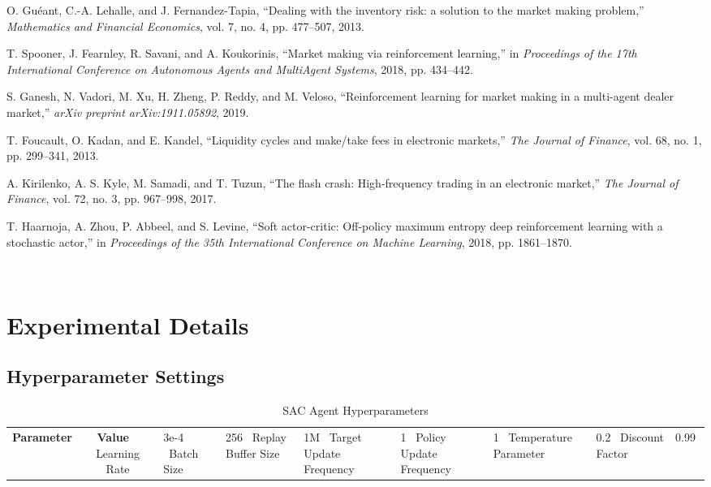 \documentclass[11pt,a4paper]{article}
\begin{document}
\begin{thebibliography}{99}
O. Gu{\'{e}}ant, C.-A. Lehalle, and J. Fernandez-Tapia, ``Dealing with the inventory risk: a solution to the market making problem,'' \emph{Mathematics and Financial Economics}, vol. 7, no. 4, pp. 477--507, 2013.

T. Spooner, J. Fearnley, R. Savani, and A. Koukorinis, ``Market making via reinforcement learning,'' in \emph{Proceedings of the 17th International Conference on Autonomous Agents and MultiAgent Systems}, 2018, pp. 434--442.

S. Ganesh, N. Vadori, M. Xu, H. Zheng, P. Reddy, and M. Veloso, ``Reinforcement learning for market making in a multi-agent dealer market,'' \emph{arXiv preprint arXiv:1911.05892}, 2019.

T. Foucault, O. Kadan, and E. Kandel, ``Liquidity cycles and make/take fees in electronic markets,'' \emph{The Journal of Finance}, vol. 68, no. 1, pp. 299--341, 2013.

A. Kirilenko, A. S. Kyle, M. Samadi, and T. Tuzun, ``The flash crash: High-frequency trading in an electronic market,'' \emph{The Journal of Finance}, vol. 72, no. 3, pp. 967--998, 2017.

T. Haarnoja, A. Zhou, P. Abbeel, and S. Levine, ``Soft actor-critic: Off-policy maximum entropy deep reinforcement learning with a stochastic actor,'' in \emph{Proceedings of the 35th International Conference on Machine Learning}, 2018, pp. 1861--1870.

\end{thebibliography}
\
\

\appendix

\section{Experimental Details}

\subsection{Hyperparameter Settings}

\begin{table}[h]
\centering
\caption{SAC Agent Hyperparameters}
\begin{tabular}{|l|c|}
\hline
\textbf{Parameter} & \textbf{Value} \
\hline
Learning Rate & 3e-4 \
Batch Size & 256 \
Replay Buffer Size & 1M \
Target Update Frequency & 1 \
Policy Update Frequency & 1 \
Temperature Parameter & 0.2 \
Discount Factor & 0.99 \
\hline
\end{tabular}
\label{tab:hyperparams}
\end{table}
\end{document}
